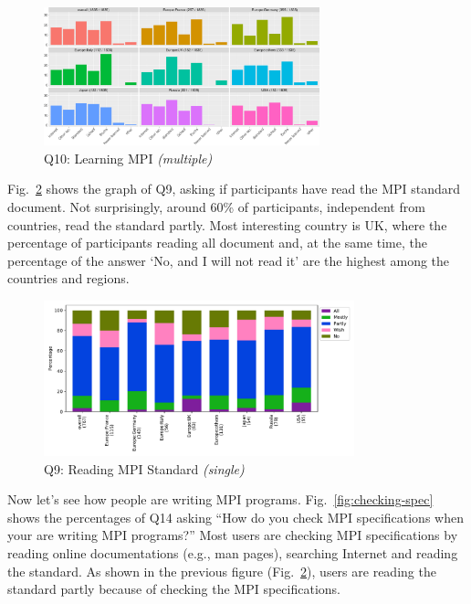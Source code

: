 \documentclass[conference,10pt,letterpaper]{IEEEtran}
\def\myquote#1{`#1'}
\begin{document}
\begin{figure}[htb]
\begin{center}
\includegraphics[width=8cm]{R-scripts/Q10.pdf}
\caption{Q10: Learning MPI {\it(multiple)}}
\label{fig:learning-mpi}
\end{center}
\end{figure}

Fig.~\ref{fig:reading-standard} shows the graph of Q9, asking if
participants have read the MPI standard document. Not surprisingly,
around 60\% of participants, independent from countries, read the
standard partly. Most interesting country is UK, where the percentage
of participants reading all document and, at the same time, the
percentage of the answer \myquote{No, and I will not read it} are the
highest among the countries and regions. 

\begin{figure}[htb]
\begin{center}
\includegraphics[width=9cm]{Figs/Q9.pdf}
\caption{Q9: Reading MPI Standard {\it(single)}}
\label{fig:reading-standard}
\end{center}
\end{figure}

Now let's see how people are writing MPI
programs. Fig.~\ref{fig:checking-spec} shows the percentages of Q14
asking ``How do you check MPI specifications when your are writing MPI
programs?'' Most users are checking MPI specifications by reading online
documentations (e.g., man pages), searching Internet and reading the
standard. As shown in the previous figure
(Fig.~\ref{fig:reading-standard}), users are reading the standard
partly because of checking the MPI specifications.
\end{document}
